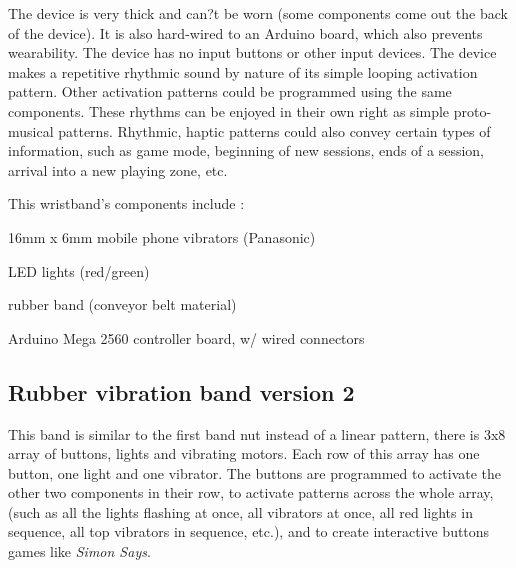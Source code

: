\documentclass{chi-ext}
\begin{document}
The device is very thick and can?t be worn (some components come out the back of the device). It is also hard-wired to an Arduino board, which also prevents wearability. The device has no input buttons or other input devices. The device makes a repetitive rhythmic sound by nature of its simple looping activation pattern. Other activation patterns could be programmed using the same components. These rhythms can be enjoyed in their own right as simple proto-musical patterns. Rhythmic, haptic patterns could also convey certain types of information, such as game mode, beginning of new sessions, ends of a session, arrival into a new playing zone, etc. 

This wristband's components include	:
\begin{inparaenum}
\item 16mm x 6mm mobile phone vibrators (Panasonic)
\item LED lights (red/green)
\item rubber band (conveyor belt material)
\item Arduino Mega 2560 controller board, w/ wired connectors
\end{inparaenum}


\subsection{Rubber vibration band version 2}
This band is similar to the first band nut instead of a linear pattern, there is 3x8 array of buttons, lights and vibrating motors. Each row of this array has one button, one light and one vibrator. The buttons are programmed to activate the other two components in their row, to activate patterns across the whole array, (such as all the lights flashing at once, all vibrators at once, all red lights in sequence, all top vibrators in sequence, etc.), and to create interactive buttons games like \emph{Simon Says}.
\end{document}
